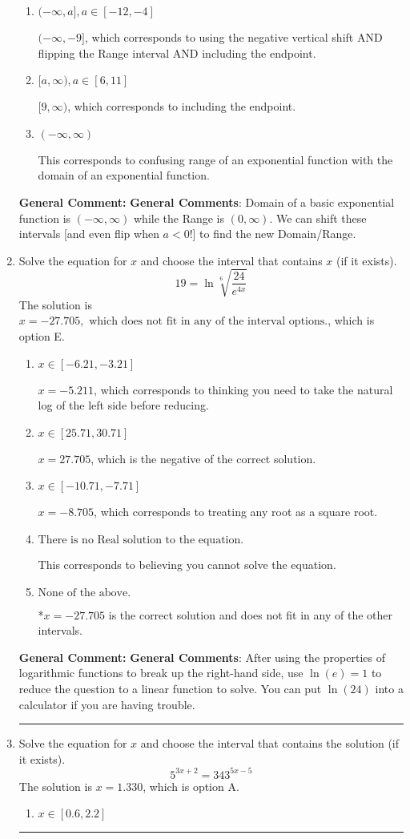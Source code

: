 \documentclass{extbook}[14pt]
\newcommand{\litem}[1]{\item #1

\rule{\textwidth}{0.4pt}}
\begin{document}
\begin{enumerate}
{\begin{enumerate}[label=\Alph*.]
* $(9, \infty)$, which is the correct option.
\item \( (-\infty, a], a \in [-12, -4] \)

$(-\infty, -9]$, which corresponds to using the negative vertical shift AND flipping the Range interval AND including the endpoint.
\item \( [a, \infty), a \in [6, 11] \)

$[9, \infty)$, which corresponds to including the endpoint.
\item \( (-\infty, \infty) \)

This corresponds to confusing range of an exponential function with the domain of an exponential function.
\end{enumerate}

\textbf{General Comment:} \textbf{General Comments}: Domain of a basic exponential function is $(-\infty, \infty)$ while the Range is $(0, \infty)$. We can shift these intervals [and even flip when $a<0$!] to find the new Domain/Range.
}
\litem{
 Solve the equation for $x$ and choose the interval that contains $x$ (if it exists).
\[  19 = \ln{\sqrt[6]{\frac{24}{e^{4x}}}} \]The solution is \( x = -27.705, \text{ which does not fit in any of the interval options.} \), which is option E.\begin{enumerate}[label=\Alph*.]
\item \( x \in [-6.21, -3.21] \)

$x = -5.211$, which corresponds to thinking you need to take the natural log of the left side before reducing.
\item \( x \in [25.71, 30.71] \)

$x = 27.705$, which is the negative of the correct solution.
\item \( x \in [-10.71, -7.71] \)

$x = -8.705$, which corresponds to treating any root as a square root.
\item \( \text{There is no Real solution to the equation.} \)

This corresponds to believing you cannot solve the equation.
\item \( \text{None of the above.} \)

*$x = -27.705$ is the correct solution and does not fit in any of the other intervals.
\end{enumerate}

\textbf{General Comment:} \textbf{General Comments}: After using the properties of logarithmic functions to break up the right-hand side, use $\ln(e) = 1$ to reduce the question to a linear function to solve. You can put $\ln(24)$ into a calculator if you are having trouble.
}
\litem{
Solve the equation for $x$ and choose the interval that contains the solution (if it exists).
\[ 5^{3x+2} = 343^{5x-5} \]The solution is \( x = 1.330 \), which is option A.\begin{enumerate}[label=\Alph*.]
\item \( x \in [0.6, 2.2] \)


\end{enumerate}}
\end{enumerate}
\end{document}
